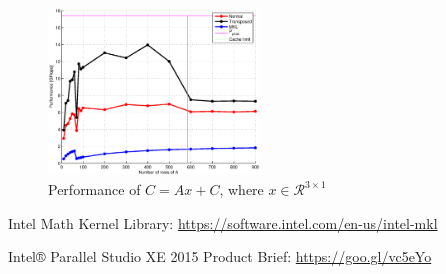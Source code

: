 \documentclass[journal, a4paper]{IEEEtran}
\begin{document}
  \begin{figure}
   \includegraphics[width=0.5\textwidth]{3x1}
   \caption{Performance of $C = Ax + C$, where $x \in \mathcal{R}^{3\times 1}$}
   \label{fig:3x1}
  \end{figure}

   


\begin{thebibliography}{5}
	
	Intel Math Kernel Library: \url{https://software.intel.com/en-us/intel-mkl}
	
	Intel® Parallel Studio XE 2015 Product Brief: \url{https://goo.gl/vc5eYo}

\end{thebibliography}

\end{document}
